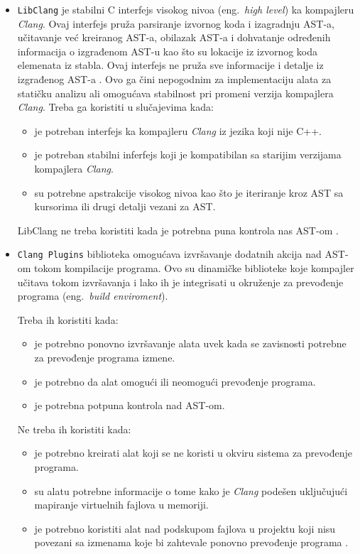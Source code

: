 \documentclass[12pt,oneside]{memoir}
\begin{document}
\begin{itemize}
\item \texttt{LibClang} je stabilni C interfejs visokog nivoa  (eng.~\textit{high level}) ka kompajleru \textit{Clang}. Ovaj interfejs pru\v{z}a parsiranje izvornog koda
i izagradnju AST-a, u\v{c}itavanje ve\'{c} kreiranog AST-a, obilazak AST-a i dohvatanje određenih informacija o izgrađenom AST-u kao \v{s}to su lokacije iz izvornog koda elemenata iz stabla. Ovaj interfejs ne pru\v{z}a sve informacije i detalje iz izgrađenog AST-a \cite{LibClang}. Ovo ga \v{c}ini nepogodnim za implementaciju alata za stati\v{c}ku analizu ali omogu\'{c}ava stabilnost pri promeni verzija kompajlera \textit{Clang}.
Treba ga koristiti u slu\v{c}ajevima kada:
\begin{itemize}
  \item je potreban interfejs ka kompajleru \textit{Clang} iz jezika koji nije C++.
  \item je potreban stabilni inferfejs koji je kompatibilan sa starijim verzijama kompajlera \textit{Clang}.
  \item su potrebne apstrakcije visokog nivoa kao \v{s}to je iteriranje kroz AST sa kursorima ili drugi detalji vezani za AST.
\end{itemize}
LibClang ne treba koristiti kada je potrebna puna kontrola nas AST-om \cite{RightInterface}.

\item \texttt{Clang Plugins} biblioteka omogu\'{c}ava izvr\v{s}avanje dodatnih akcija nad AST-om tokom kompilacije programa. Ovo su dinami\v{c}ke biblioteke koje kompajler u\v{c}itava tokom izvr\v{s}avanja i lako ih je integrisati u okru\v{z}enje za prevođenje programa (eng.~\textit{build enviroment}).

Treba ih koristiti kada:

\begin{itemize}
\item je potrebno ponovno izvr\v{s}avanje alata uvek kada se zavisnosti potrebne za prevođenje programa izmene.
\item je potrebno da alat omogu\'{c}i ili neomogu\'{c}i prevođenje programa.
\item je potrebna potpuna kontrola nad AST-om.
\end{itemize}
Ne treba ih koristiti kada:
\begin{itemize}
\item je potrebno kreirati alat koji se ne koristi u okviru sistema za prevođenje programa.
\item su alatu potrebne informacije o tome kako je \textit{Clang} pode\v{s}en uklju\v{c}uju\'{c}i mapiranje virtuelnih fajlova u memoriji.
\item je potrebno koristiti alat nad podskupom fajlova u projektu koji nisu povezani sa izmenama koje bi zahtevale ponovno prevođenje programa \cite{RightInterface}.
\end{itemize}


\end{itemize}
\end{document}
